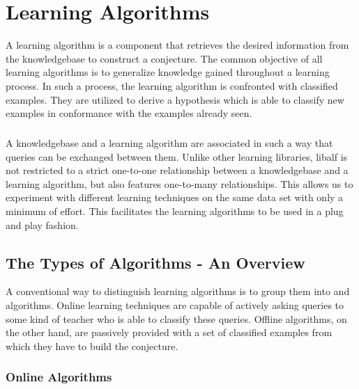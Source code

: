 \chapter{Learning Algorithms}

A learning algorithm is a component that retrieves the desired information from the knowledgebase to construct a conjecture. 
The common objective of all learning algorithms is to generalize knowledge gained throughout a learning process. In such a process, the learning algorithm is confronted with classified examples. They are utilized to derive a hypothesis which is able to classify new examples in conformance with the examples already seen.
\paragraph{}
A knowledgebase and a learning algorithm are associated in such a way that queries can be exchanged between them. Unlike other learning libraries, libalf is not restricted to a strict one-to-one relationship between a knowledgebase and a learning algorithm, but
also features one-to-many relationships. This allows us to experiment with different learning techniques on the same data set with only a minimum of effort. This facilitates the learning algorithms to be used in a plug and play fashion.

\section{The Types of Algorithms - An Overview}

A conventional way to distinguish learning algorithms is to group them into \online and \offline algorithms. Online learning techniques are capable of actively asking queries to some kind of teacher who is able to classify these queries. Offline algorithms, on the other hand, are passively provided with a set of classified examples from which they have to build the conjecture.

\subsection{Online Algorithms}

